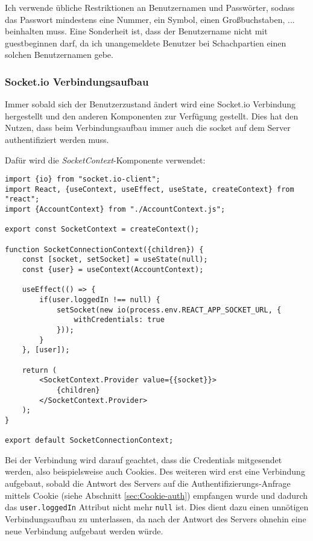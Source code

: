 Ich verwende übliche Restriktionen an Benutzernamen und Passwörter, sodass das Passwort mindestens eine Nummer, ein Symbol, einen Großbuchstaben, ... beinhalten muss. Eine Sonderheit ist, dass der Benutzername nicht mit \glqq guest\grqq{ }beginnen darf, da ich unangemeldete Benutzer bei Schachpartien einen solchen Benutzernamen gebe. 


\subsubsection{Socket.io Verbindungsaufbau}
\label{sec:socket-Verbindung}
Immer sobald sich der Benutzerzustand ändert wird eine Socket.io Verbindung hergestellt und den anderen Komponenten zur Verfügung gestellt. Dies hat den Nutzen, dass beim Verbindungsaufbau immer auch die socket auf dem Server authentifiziert werden muss.

Dafür wird die \textit{SocketContext}-Komponente verwendet:

\begin{lstlisting}[style=codeStyle, caption={Die Datei \textit{SocketContext.js}}, label={lst:SocketContext}]
import {io} from "socket.io-client";
import React, {useContext, useEffect, useState, createContext} from "react";
import {AccountContext} from "./AccountContext.js";

export const SocketContext = createContext();

function SocketConnectionContext({children}) {
    const [socket, setSocket] = useState(null);
    const {user} = useContext(AccountContext);

    useEffect(() => {
        if(user.loggedIn !== null) {
            setSocket(new io(process.env.REACT_APP_SOCKET_URL, {
                withCredentials: true
            }));
        }
    }, [user]);

    return (
        <SocketContext.Provider value={{socket}}>
            {children}
        </SocketContext.Provider>
    );
}

export default SocketConnectionContext;
\end{lstlisting}

Bei der Verbindung wird darauf geachtet, dass die Credentials mitgesendet werden, also beispielsweise auch Cookies. Des weiteren wird erst eine Verbindung aufgebaut, sobald die Antwort des Servers auf die Authentifizierungs-Anfrage mittels Cookie (siehe Abschnitt \ref{sec:Cookie-auth}) empfangen wurde und dadurch das \verb|user.loggedIn| Attribut nicht mehr \verb|null| ist. Dies dient dazu einen unnötigen Verbindungsaufbau zu unterlassen, da nach der Antwort des Servers ohnehin eine neue Verbindung aufgebaut werden würde.

